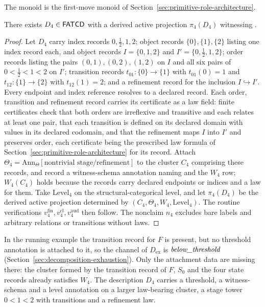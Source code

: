 The monoid is the first-move monoid of
Section~\ref{sec:primitive-role-architecture}.

\begin{proposition}\label{prop:p4-witness}
There exists \(D_4 \in \mathsf{FATCD}{}\) with a derived active projection
\(\pi_4(D_4)\) witnessing \Pfour{}.
\end{proposition}

\begin{proof}
Let \(D_4\) carry index records \(0,\tfrac12,1,2\); object records
\(\{0\},\{1\},\{2\}\) listing one index record each, and object records
\(I=\{0,1,2\}\) and \(I'=\{0,\tfrac12,1,2\}\); order records listing the pairs \((0,1),(0,2),(1,2)\)
on \(I\) and all six pairs of \(0<\tfrac12<1<2\) on \(I'\); transition records
\(t_{01}:\{0\}\to\{1\}\) with \(t_{01}(0)=1\) and \(t_{12}:\{1\}\to\{2\}\) with
\(t_{12}(1)=2\); and a refinement record
for the inclusion \(I\hookrightarrow I'\).
Every endpoint and index reference resolves to a declared record. Each
order, transition and refinement record carries its certificate as a law
field: finite certificates check that both orders are irreflexive and
transitive and each relates at least one pair, that each transition is defined on its declared domain with values
in its declared codomain, and that the refinement maps \(I\) into \(I'\) and preserves order, each certificate being the prescribed law formula of Section~\ref{sec:primitive-role-architecture} for its record. Attach
\(\Theta_4=\mathrm{Ann}_\Theta[\text{nontrivial stage/refinement}]\)
to the cluster \(C_4\) comprising these records, and record a
witness-schema annotation naming \Pfour{} and the \(W_4\) row; \(W_4(C_4)\)
holds because the records carry declared endpoints or indices and a law for
them. Take
\(\mathrm{Level}_4\) on the structural-categorical level, and let
\(\pi_4(D_4)\) be the derived active projection determined by
\((C_4,\Theta_4,W_4,\mathrm{Level}_4)\). The routine verifications
\(v_4^{\mathrm{fin}}, v_4^{\mathrm{cl}}, v_4^{\mathrm{aud}}\) then
follow. The nonclaim \(n_4\) excludes bare labels and arbitrary
relations or transitions without laws.
\end{proof}

In the running example the transition record for \(F\) is present, but no
threshold annotation is attached to it, so the \Pfour{} channel of
\(D_{\mathrm{ex}}\) is \(\textit{below\_\allowbreak threshold}\) (Section~\ref{sec:decomposition-exhaustion}).
Only the attachment data are missing there: the cluster formed by the transition
record of \(F\), \(S_0\) and the four state records already satisfies \(W_4\). The description \(D_4\) carries a threshold, a
witness-schema and a level annotation on a larger law-bearing cluster, a stage
tower \(0<1<2\) with transitions and a refinement law.

